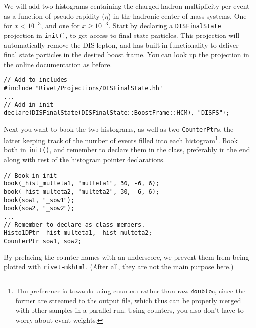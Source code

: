 \documentclass[11pt]{article}
\begin{document}
We will add two histograms containing the charged hadron multiplicity per event as a function of pseudo-rapidity ($\eta$) in the hadronic center of mass systems. One for $x < 10^{-3}$, and one for $x \geq 10^{-3}$. Start by declaring a \texttt{DISFinalState} projection in \texttt{init()}, to get access to final state particles. This projection will automatically remove the DIS lepton, and has built-in functionality to deliver final state particles in the desired boost frame. You can look up the projection in the online documentation as before.

\begin{verbatim}
// Add to includes
#include "Rivet/Projections/DISFinalState.hh"
...
// Add in init
declare(DISFinalState(DISFinalState::BoostFrame::HCM), "DISFS");
\end{verbatim}

Next you want to book the two histograms, as well as two \texttt{CounterPtr}s, the latter keeping track of the number
of events filled into each histogram\footnote{The preference is towards using counters rather than raw \texttt{double}s, since the former are streamed to the output file, which thus can be properly merged with other samples in a parallel run. Using counters, you also don't have to worry about event weights.}. Book both in \texttt{init()}, and remember to declare them in the class, preferably in the end along with rest of the histogram pointer declarations.

\begin{verbatim}
// Book in init
book(_hist_multeta1, "multeta1", 30, -6, 6);      
book(_hist_multeta2, "multeta2", 30, -6, 6);
book(sow1, "_sow1");      
book(sow2, "_sow2");
...
// Remember to declare as class members.
Histo1DPtr _hist_multeta1, _hist_multeta2;
CounterPtr sow1, sow2;
\end{verbatim}
By prefacing the counter names with an underscore, we prevent them from being plotted with \texttt{rivet-mkhtml}. (After all, they are not the main purpose here.)
\end{document}

